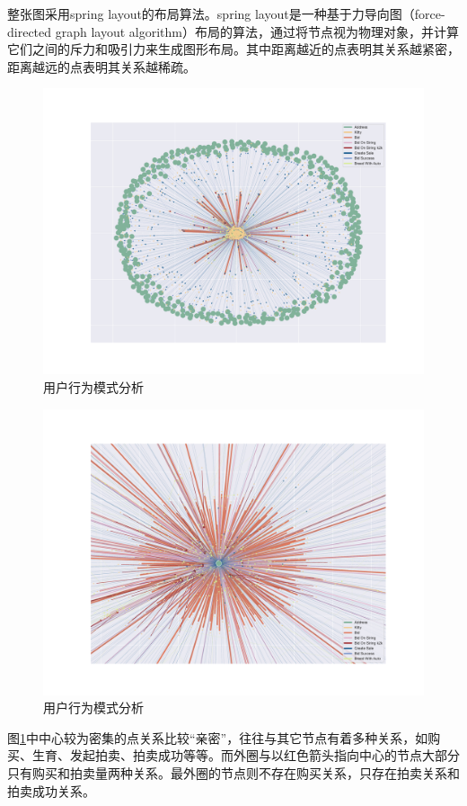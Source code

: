 \documentclass{myreport}
\begin{document}
整张图采用spring layout的布局算法。spring layout是一种基于力导向图（force-directed graph layout algorithm）布局的算法，通过将节点视为物理对象，并计算它们之间的斥力和吸引力来生成图形布局。其中距离越近的点表明其关系越紧密，距离越远的点表明其关系越稀疏。
\begin{figure}[!htbp]
	\centering
	\includegraphics[width=4.5in]{figure/network1.pdf}
	\caption{用户行为模式分析}
	\label{fig:network1}
\end{figure}

\begin{figure}[!htbp]
	\centering
	\includegraphics[width=4.5in]{figure/network2.pdf}
	\caption{用户行为模式分析}
	\label{fig:network2}
\end{figure}

图\ref{fig:network1}中中心较为密集的点关系比较“亲密”，往往与其它节点有着多种关系，如购买、生育、发起拍卖、拍卖成功等等。而外圈与以红色箭头指向中心的节点大部分只有购买和拍卖量两种关系。最外圈的节点则不存在购买关系，只存在拍卖关系和拍卖成功关系。
\end{document}
